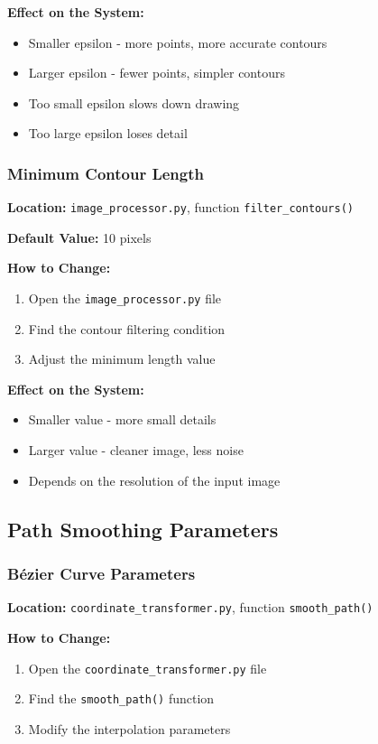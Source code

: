 \documentclass[a4paper,12pt]{article}
\begin{document}
\textbf{Effect on the System:}
\begin{itemize}
\item Smaller epsilon - more points, more accurate contours
\item Larger epsilon - fewer points, simpler contours
\item Too small epsilon slows down drawing
\item Too large epsilon loses detail
\end{itemize}

\subsubsection{Minimum Contour Length}
\textbf{Location:} \texttt{image\_processor.py}, function \texttt{filter\_contours()}

\textbf{Default Value:} 10 pixels

\textbf{How to Change:}
\begin{enumerate}
\item Open the \texttt{image\_processor.py} file
\item Find the contour filtering condition
\item Adjust the minimum length value
\end{enumerate}

\textbf{Effect on the System:}
\begin{itemize}
\item Smaller value - more small details
\item Larger value - cleaner image, less noise
\item Depends on the resolution of the input image
\end{itemize}

\subsection{Path Smoothing Parameters}

\subsubsection{Bézier Curve Parameters}
\textbf{Location:} \texttt{coordinate\_transformer.py}, function \texttt{smooth\_path()}

\textbf{How to Change:}
\begin{enumerate}
\item Open the \texttt{coordinate\_transformer.py} file
\item Find the \texttt{smooth\_path()} function
\item Modify the interpolation parameters
\end{enumerate}
\end{document}
